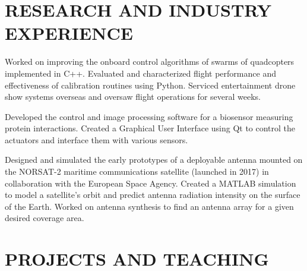 \documentclass{ResumeTemplate}
\begin{document}
	\section{RESEARCH AND INDUSTRY EXPERIENCE}
	

	\workitemsthree
	{Worked on improving the onboard control algorithms of swarms of quadcopters implemented in C++.}
	{Evaluated and characterized flight performance and effectiveness of calibration routines using Python.}
	{Serviced entertainment drone show systems overseas and oversaw flight operations for several weeks.}
	
	
	\workitemstwo
	{Developed the control and image processing software for a biosensor measuring protein interactions.}
	{Created a Graphical User Interface using Qt to control the actuators and interface them with various sensors.}
	

	\workitemstwo
	{Designed and simulated the early prototypes of a deployable antenna mounted on the NORSAT-2 maritime communications satellite (launched in 2017) in collaboration with the European Space Agency.}
	{Created a MATLAB simulation to model a satellite's orbit and predict antenna radiation intensity on the surface of the Earth. Worked on antenna synthesis to find an antenna array for a given desired coverage area.}
	
	\section{PROJECTS AND TEACHING}
	
\end{document}

